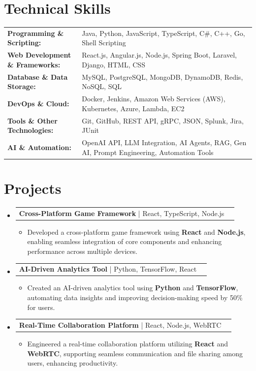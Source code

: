 \documentclass[letterpaper,10pt]{article}
\makeatletter
\newcommand{\resumeItem}[1]{
  \item{\fontsize{8pt}{9pt}\selectfont
    #1 \vspace{-3pt}
  }
}
\newcommand{\resumeProjectHeading}[2]{
    \item
    \begin{tabular*}{1.001\textwidth}{l@{\extracolsep{\fill}}r}
      \fontsize{8.5pt}{10pt}#1 & \textbf{\fontsize{8.5pt}{10pt} #2}\\
    \end{tabular*}\vspace{-7pt}
}
\newcommand{\resumeSubHeadingListStart}{\begin{itemize}[leftmargin=0pt, label={}]}
\newcommand{\resumeSubHeadingListEnd}{\end{itemize}}
\newcommand{\resumeItemListStart}{\begin{itemize}[leftmargin=*]}
\newcommand{\resumeItemListEnd}{\end{itemize}\vspace{-5pt}}
\makeatother
\begin{document}
\section{Technical Skills}
        \vspace{-14pt}
        \begin{table}[h]
            \fontsize{8pt}{9pt}\selectfont
            \begin{tabular}{p{0.3\linewidth} p{0.7\linewidth}}
                \textbf{Programming \& Scripting:} & Java, Python, JavaScript, TypeScript, C\#, C++, Go, Shell Scripting \\
                \textbf{Web Development \& Frameworks:} & React.js, Angular.js, Node.js, Spring Boot, Laravel, Django, HTML, CSS \\
                \textbf{Database \& Data Storage:} & MySQL, PostgreSQL, MongoDB, DynamoDB, Redis, NoSQL, SQL \\
                \textbf{DevOps \& Cloud:} & Docker, Jenkins, Amazon Web Services (AWS), Kubernetes, Azure, Lambda, EC2 \\
                \textbf{Tools \& Other Technologies:} & Git, GitHub, REST API, gRPC, JSON, Splunk, Jira, JUnit \\
                \textbf{AI \& Automation:} & OpenAI API, LLM Integration, AI Agents, RAG, Gen AI, Prompt Engineering, Automation Tools \\
            \end{tabular}
        \end{table}
 \vspace{-18pt}

\section{Projects}
    \vspace{-5pt}
    \resumeSubHeadingListStart
          \resumeProjectHeading
            {\textbf{Cross-Platform Game Framework} | React, TypeScript, Node.js}{}
            \resumeItemListStart
                \resumeItem{Developed a cross-platform game framework using \textbf{React} and \textbf{Node.js}, enabling seamless integration of core components and enhancing performance across multiple devices.}
            \resumeItemListEnd
        \vspace{-12pt}
    
        \resumeProjectHeading
            {\textbf{AI-Driven Analytics Tool} | Python, TensorFlow, React}{}
        \resumeItemListStart
                \resumeItem{Created an AI-driven analytics tool using \textbf{Python} and \textbf{TensorFlow}, automating data insights and improving decision-making speed by 50\% for users.}
        \resumeItemListEnd
      \vspace{-12pt}
      \resumeProjectHeading
        {\textbf{Real-Time Collaboration Platform} | React, Node.js, WebRTC}{}
    \resumeItemListStart
            \resumeItem{Engineered a real-time collaboration platform utilizing \textbf{React} and \textbf{WebRTC}, supporting seamless communication and file sharing among users, enhancing productivity.}
    \resumeItemListEnd
    \resumeSubHeadingListEnd
\end{document}
